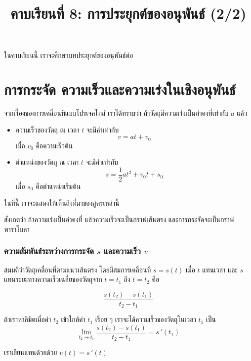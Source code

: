 \title{คาบเรียนที่ 8: การประยุกต์ของอนุพันธ์ (2/2)}
\frame{\titlepage}

\begin{frame}
ในคาบเรียนนี้ เราจะศึกษาบทประยุกต์ของอนุพันธ์ต่อ
\tableofcontents
\end{frame}


\section[การกระจัด ความเร็ว และความเร่ง]{การกระจัด ความเร็วและความเร่งในเชิงอนุพันธ์}
\frame{\sectionpage}

\begin{frame}
\end{frame}

\begin{frame}
จากเรื่องของการเคลื่อนที่แบบโปรเจคไทล์ เราได้ทราบว่า ถ้าวัตถุมีความเร่งเป็นค่าคงที่เท่ากับ $a$ แล้ว 
\begin{itemize}
\item ความเร็วของวัตถุ ณ เวลา $t$ จะมีค่าเท่ากับ
\[v = at + v_0\]
เมื่อ $v_0$ คือความเร็วต้น
\item ตำแหน่งของวัตถุ ณ เวลา $t$ จะมีค่าเท่ากับ
\[s = \frac{1}{2}at^2 + v_0t + s_0\]
เมื่อ $s_0$ คือตำแหน่งเริ่มต้น
\end{itemize}
ในที่นี้ เราจะแสดงให้เห็นถึงที่มาของสูตรเหล่านี้
\end{frame}

\begin{frame}
สังเกตว่า ถ้าความเร่งเป็นค่าคงที่ แล้วความเร็วจะเป็นกราฟเส้นตรง และการกระจัดจะเป็นกราฟพาราโบลา
\end{frame}

\begin{frame}[t]
\frametitle{ความสัมพันธ์ระหว่างการกระจัด $s$ และความเร็ว $v$}
สมมติว่าวัตถุเคลื่อนที่ตามแนวเส้นตรง \pa โดยมีสมการเคลื่อนที่ $s = s(t)$ เมื่อ $t$ แทนเวลา และ $s$ แทนระยะทาง\pa ความเร็วเฉลี่ยของวัตถุจาก $t = t_1$ ถึง $t = t_2$ \pa คือ 
\begin{slide}
\[ \frac{s(t_2) - s(t_1)}{t_2 - t_1}\] \pa

ถ้าเราหาลิมิตเมื่อค่า $t_2$ เข้าใกล้ค่า $t_1$ เรื่อย ๆ \pa เราจะได้ความเร็วของวัตถุในเวลา $t_1$ เป็น \pa
\[ \lim_{t_2 \rightarrow t_1} \frac{s(t_2) - s(t_1)}{t_2 - t_1} = s\,'(t_1) \] \pa

เราเขียนแทนด้วยด้วย $v(t) = s\,'(t)$
\end{slide}
\end{frame}


